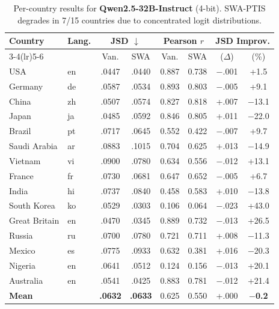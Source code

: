 \documentclass{article}
\newcommand{\gain}[1]{\textcolor{improvegreen}{#1}}
\newcommand{\loss}[1]{\textcolor{worsered}{#1}}
\begin{document}
\begin{table}[h]
\caption{Per-country results for \textbf{Qwen2.5-32B-Instruct} (4-bit).
SWA-PTIS degrades in 7/15 countries due to concentrated logit distributions.}
\label{tab:qwen32b_percountry}
\centering\setlength{\tabcolsep}{3.5pt}\footnotesize
\begin{tabular}{llcccccc}
\toprule
Country & Lang. & \multicolumn{2}{c}{JSD $\downarrow$} & \multicolumn{2}{c}{Pearson $r$} & \multicolumn{2}{c}{JSD Improv.} \\
\cmidrule(lr){3-4}\cmidrule(lr){5-6}
 & & Van. & SWA & Van. & SWA & ($\Delta$) & (\%) \\
\midrule
USA & en &.0447 &.0440 & 0.887 & 0.738 & $-$.001 & \gain{+1.5} \\
Germany & de &.0587 &.0534 & 0.893 & 0.803 & $-$.005 & \gain{+9.1} \\
China & zh &.0507 &.0574 & 0.827 & 0.818 & +.007 & \loss{$-$13.1} \\
Japan & ja &.0485 &.0592 & 0.846 & 0.805 & +.011 & \loss{$-$22.0} \\
Brazil & pt &.0717 &.0645 & 0.552 & 0.422 & $-$.007 & \gain{+9.7} \\
Saudi Arabia& ar &.0883 &.1015 & 0.704 & 0.625 & +.013 & \loss{$-$14.9} \\
Vietnam & vi &.0900 &.0780 & 0.634 & 0.556 & $-$.012 & \gain{+13.1} \\
France & fr &.0730 &.0681 & 0.647 & 0.652 & $-$.005 & \gain{+6.7} \\
India & hi &.0737 &.0840 & 0.458 & 0.583 & +.010 & \loss{$-$13.8} \\
South Korea & ko &.0529 &.0303 & 0.106 & 0.064 & $-$.023 & \gain{+43.0} \\
Great Britain& en&.0470 &.0345 & 0.889 & 0.732 & $-$.013 & \gain{+26.5} \\
Russia & ru &.0700 &.0780 & 0.721 & 0.711 & +.008 & \loss{$-$11.3} \\
Mexico & es &.0775 &.0933 & 0.632 & 0.381 & +.016 & \loss{$-$20.3} \\
Nigeria & en &.0641 &.0512 & 0.124 & 0.156 & $-$.013 & \gain{+20.1} \\
Australia & en &.0541 &.0425 & 0.883 & 0.781 & $-$.012 & \gain{+21.4} \\
\midrule
\textbf{Mean} & & \textbf{.0632} & \textbf{.0633} & 0.625 & 0.550 & +.000 & \loss{\textbf{$-$0.2}} \\
\bottomrule
\end{tabular}
\end{table}
\end{document}
